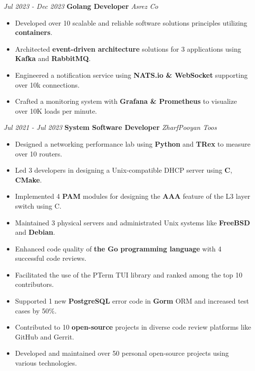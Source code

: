 \documentclass{engineercv}
\begin{document}
\begin{twocolentry}{\textit{Jul 2023 - Dec 2023}}
  \textbf{Golang Developer}
  \textit{Asrez Co}
\end{twocolentry}

\begin{itemize}
  \item Developed over 10 scalable and reliable software solutions principles utilizing \textbf{containers}.
  \item Architected \textbf{event-driven architecture} solutions for 3 applications using \textbf{Kafka} and \textbf{RabbitMQ}.
  \item Engineered a notification service using \textbf{NATS.io \& WebSocket} supporting over 10k connections.
  \item Crafted a monitoring system with \textbf{Grafana \& Prometheus} to visualize over 10K loads per minute.
\end{itemize}

\begin{twocolentry}{\textit{Jul 2021 - Jul 2023}}
  \textbf{System Software Developer}
  \textit{ZharfPooyan Toos}
\end{twocolentry}

\begin{itemize}
  \item Designed a networking performance lab using \textbf{Python} and \textbf{TRex} to measure over 10 routers.
  \item Led 3 developers in designing a Unix-compatible DHCP server using \textbf{C}, \textbf{CMake}.
  \item Implemented 4 \textbf{PAM} modules for designing the \textbf{AAA} feature of the L3 layer switch using C.
  \item Maintained 3 physical servers and administrated Unix systems like \textbf{FreeBSD} and \textbf{Debian}.
\end{itemize}

\begin{itemize}
  \item Enhanced code quality of \textbf{the Go programming language} with 4 successful code reviews.
  \item Facilitated the use of the PTerm TUI library and ranked among the top 10 contributors.
  \item Supported 1 new \textbf{PostgreSQL} error code in \textbf{Gorm} ORM and increased test cases by 50\%.
  \item Contributed to 10 \textbf{open-source} projects in diverse code review platforms like GitHub and Gerrit.
  \item Developed and maintained over 50 personal open-source projects using various technologies.
\end{itemize}
\end{document}
